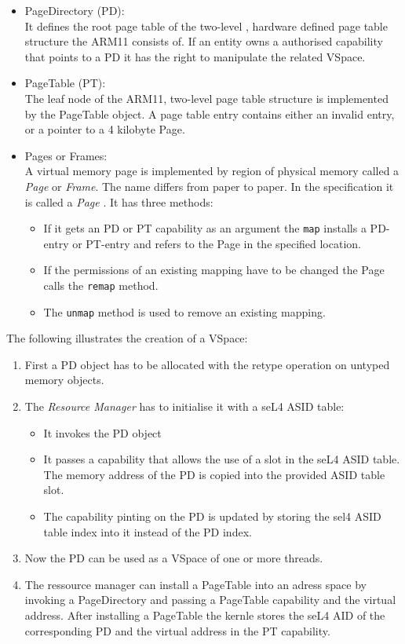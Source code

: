 \begin{itemize}
\begin{itemize}
\item PageDirectory (PD): \\
It defines the root page table of the two-level , hardware defined page table structure the ARM11 consists of. If an entity owns a authorised capability that points to a PD it has the right to manipulate the related VSpace.
\item PageTable (PT): \\
The leaf node of the ARM11, two-level page table structure is implemented by the PageTable object. A page table entry contains either an invalid
entry, or a pointer to a 4 kilobyte Page.
\item Pages or Frames: \\
A virtual memory page is implemented by region of physical memory called a \textit{Page} or \textit{Frame}. The name differs from paper to paper. In the specification it is called a \textit{Page} \cite{sel4}. It has three methods:
\begin{itemize}
\item If it gets an PD or PT capability as an argument the \texttt{map} installs a PD-entry or PT-entry and refers to the Page in the specified location.
\item If the permissions of an existing mapping have to be changed the Page calls the \texttt{remap} method.
\item The \texttt{unmap} method is used to remove an existing mapping.
\end{itemize}
\end{itemize}
The following illustrates the creation of a VSpace:
\begin{enumerate}
\item First a PD object has to be allocated with the retype operation on untyped memory objects. 
\item The \textit{Resource Manager} has to initialise it with a seL4 ASID table:
\begin{itemize}
\item It invokes the PD object
\item It passes a capability that allows the use of a slot in the seL4 ASID table. The memory address of the PD is copied into the provided ASID table slot. 
\item The capability pinting on the PD is updated by storing the sel4 ASID table index into it instead of the PD index. 
\end{itemize}
\item Now the PD can be used as a VSpace of one or more threads.
\item The ressource manager can install a PageTable into  an adress space by invoking a PageDirectory and passing a PageTable capability and the virtual address. After installing a PageTable the kernle stores the seL4 AID of the corresponding PD and the virtual address in the PT capability. 

\end{enumerate}
\end{itemize}
